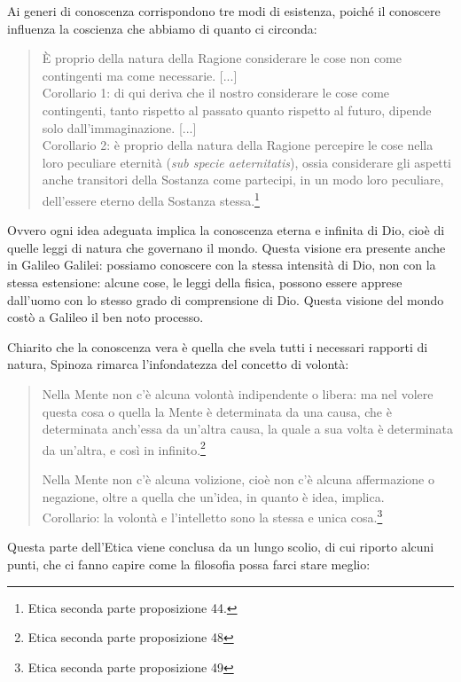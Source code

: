 Ai generi di conoscenza corrispondono tre modi di esistenza, poiché  il conoscere influenza la coscienza che abbiamo di quanto ci circonda:

\begin{quotation}
	\small È proprio della natura della Ragione considerare le cose non come contingenti ma come
	necessarie. [...]\\
 Corollario 1: di qui deriva che il nostro considerare le cose come contingenti, tanto
	rispetto al passato quanto rispetto al futuro, dipende solo dall’immaginazione. [...]\\Corollario 2: è proprio della natura della Ragione percepire le cose nella loro peculiare eternità (\textit{sub specie aeternitatis}), ossia considerare gli aspetti anche transitori della Sostanza come partecipi,
	in un modo loro peculiare, dell’essere eterno della Sostanza stessa.\footnote{Etica seconda parte proposizione 44.}
\end{quotation}

Ovvero ogni idea adeguata implica la conoscenza eterna e infinita di Dio, cioè di quelle leggi di natura che governano il mondo. Questa visione era presente anche in Galileo Galilei: possiamo conoscere con la stessa intensità di Dio, non con la stessa estensione: alcune cose, le leggi della fisica, possono essere apprese dall'uomo con lo stesso grado di comprensione di Dio. Questa visione del mondo costò a Galileo il ben noto processo.

Chiarito che la conoscenza vera è quella che svela tutti i necessari rapporti di natura, Spinoza rimarca l'infondatezza del concetto di volontà:

\begin{quotation}
	\small Nella Mente non c’è alcuna volontà indipendente o libera: ma nel volere questa cosa o
	quella la Mente è determinata da una causa, che è determinata anch’essa da un’altra causa,
	la quale a sua volta è determinata da un’altra, e così in infinito.\footnote{Etica seconda parte proposizione 48}
	
	\small Nella Mente non c’è alcuna volizione, cioè non c’è alcuna affermazione o negazione, oltre
	a quella che un’idea, in quanto è idea, implica.\\Corollario: la volontà e l’intelletto sono la stessa e unica cosa.\footnote{Etica seconda parte proposizione 49}
\end{quotation}

Questa parte dell'Etica viene conclusa da un lungo scolio, di cui riporto alcuni punti, che ci fanno capire come la filosofia possa farci stare meglio:

